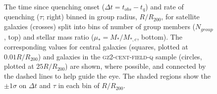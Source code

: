 \begin{figure}
{\caption[Trend of $\Delta t$ and $\tau$ with group radius split by number in group and stellar mass ratio]{The time since quenching onset ($\Delta t = t_{obs} - t_{q}$) and rate of quenching ($\tau$; right) binned in group radius, $R/R_{200}$, for satellite galaxies (crosses) split into bins of number of group members ($N_{group}$, top) and stellar mass ratio ($\mu_* = M_*/M_{*,c}$, bottom). The corresponding values for central galaxies (squares, plotted at $0.01 R/R_{200}$) and galaxies in the \textsc{gz2-cent-field-q} sample (circles, plotted at $25 R/R_{200}$) are shown, where possible, and connected by the dashed lines to help guide the eye. The shaded regions show the $\pm1\sigma$ on $\Delta t$ and $\tau$ in each bin of $R/R_{200}$.}
\label{fig:timesinceradiusmu}}
\end{figure}

